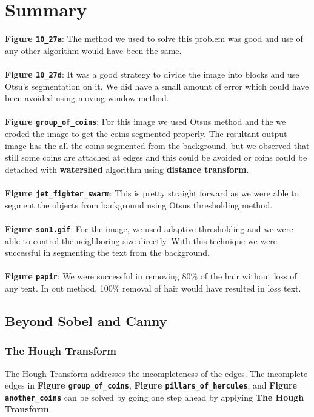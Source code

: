 \chapter{Summary}
\textbf{Figure \texttt{10\_27a}}: The method we used to solve this problem was good and use of any other algorithm would have been the same.
\\
\\
\textbf{Figure \texttt{10\_27d}}: It was a good strategy to divide the image into blocks and use Otsu’s segmentation on it. We did have a small amount of error which could have been avoided using moving window method.
\\
\\
\textbf{Figure \texttt{group\_of\_coins}}: For this image we used Otsus method and the we eroded the image to get the coins segmented properly. The resultant output image has the all the coins segmented from the background, but we observed that still some coins are attached at edges and this could be avoided or coins could be detached with \textbf{watershed} algorithm using \textbf{distance transform}.
\\
\\
\textbf{Figure \texttt{jet\_fighter\_swarm}}: This is pretty straight forward as we were able to segment the objects from background using Otsus thresholding method.
\\
\\
\textbf{Figure \texttt{son1.gif}}: For the image, we used adaptive thresholding and we were able to control the neighboring size directly. With this technique we were successful in segmenting the text from the background.
\\
\\
\textbf{Figure \texttt{papir}}: We were successful in removing 80\% of the hair without loss of any text. In out method, 100\% removal of hair would have resulted in loss text.

\pagebreak

\section{Beyond Sobel and Canny}
\subsection{The Hough Transform}
The Hough Transform addresses the incompleteness of the edges. The incomplete edges in \textbf{Figure \texttt{group\_of\_coins}}, \textbf{Figure \texttt{pillars\_of\_hercules}}, and \textbf{Figure \texttt{another\_coins}} can be solved by going one step ahead by applying \textbf{The Hough Transform}.

